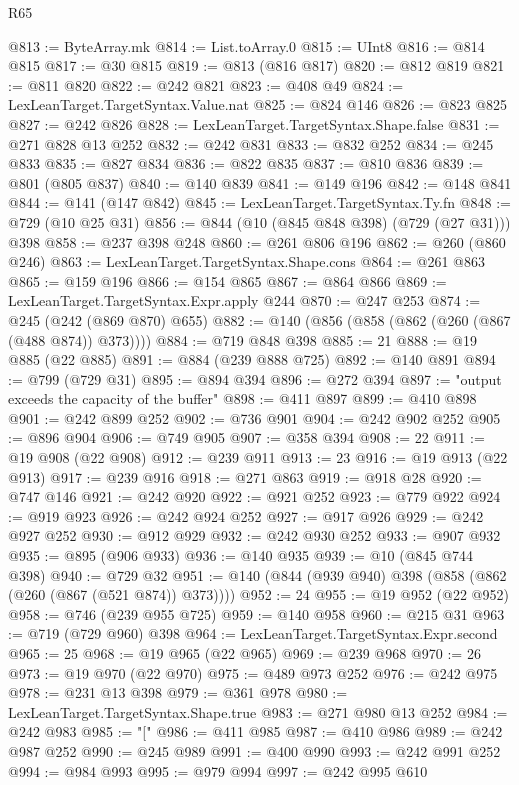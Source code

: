 \begin{lexlean}{R65}
\begin{coremodule}
@813 := ByteArray.mk
@814 := List.toArray.{0}
@815 := UInt8
@816 := @814 @815
@817 := @30 @815
@819 := @813 (@816 @817)
@820 := @812 @819
@821 := @811 @820
@822 := @242 @821
@823 := @408 @49
@824 := LexLeanTarget.TargetSyntax.Value.nat
@825 := @824 @146
@826 := @823 @825
@827 := @242 @826
@828 := LexLeanTarget.TargetSyntax.Shape.false
@831 := @271 @828 @13 @252
@832 := @242 @831
@833 := @832 @252
@834 := @245 @833
@835 := @827 @834
@836 := @822 @835
@837 := @810 @836
@839 := @801 (@805 @837)
@840 := @140 @839
@841 := @149 @196
@842 := @148 @841
@844 := @141 (@147 @842)
@845 := LexLeanTarget.TargetSyntax.Ty.fn
@848 := @729 (@10 @25 @31)
@856 := @844 (@10 (@845 @848 @398) (@729 (@27 @31))) @398
@858 := @237 @398 @248
@860 := @261 @806 @196
@862 := @260 (@860 @246)
@863 := LexLeanTarget.TargetSyntax.Shape.cons
@864 := @261 @863
@865 := @159 @196
@866 := @154 @865
@867 := @864 @866
@869 := LexLeanTarget.TargetSyntax.Expr.apply @244
@870 := @247 @253
@874 := @245 (@242 (@869 @870) @655)
@882 := @140 (@856 (@858 (@862 (@260 (@867 (@488 @874)) @373))))
@884 := @719 @848 @398
@885 := 21
@888 := @19 @885 (@22 @885)
@891 := @884 (@239 @888 @725)
@892 := @140 @891
@894 := @799 (@729 @31)
@895 := @894 @394
@896 := @272 @394
@897 := "output exceeds the capacity of the buffer"
@898 := @411 @897
@899 := @410 @898
@901 := @242 @899 @252
@902 := @736 @901
@904 := @242 @902 @252
@905 := @896 @904
@906 := @749 @905
@907 := @358 @394
@908 := 22
@911 := @19 @908 (@22 @908)
@912 := @239 @911
@913 := 23
@916 := @19 @913 (@22 @913)
@917 := @239 @916
@918 := @271 @863
@919 := @918 @28
@920 := @747 @146
@921 := @242 @920
@922 := @921 @252
@923 := @779 @922
@924 := @919 @923
@926 := @242 @924 @252
@927 := @917 @926
@929 := @242 @927 @252
@930 := @912 @929
@932 := @242 @930 @252
@933 := @907 @932
@935 := @895 (@906 @933)
@936 := @140 @935
@939 := @10 (@845 @744 @398)
@940 := @729 @32
@951 := @140 (@844 (@939 @940) @398 (@858 (@862 (@260 (@867 (@521 @874)) @373))))
@952 := 24
@955 := @19 @952 (@22 @952)
@958 := @746 (@239 @955 @725)
@959 := @140 @958
@960 := @215 @31
@963 := @719 (@729 @960) @398
@964 := LexLeanTarget.TargetSyntax.Expr.second
@965 := 25
@968 := @19 @965 (@22 @965)
@969 := @239 @968
@970 := 26
@973 := @19 @970 (@22 @970)
@975 := @489 @973 @252
@976 := @242 @975
@978 := @231 @13 @398
@979 := @361 @978
@980 := LexLeanTarget.TargetSyntax.Shape.true
@983 := @271 @980 @13 @252
@984 := @242 @983
@985 := "["
@986 := @411 @985
@987 := @410 @986
@989 := @242 @987 @252
@990 := @245 @989
@991 := @400 @990
@993 := @242 @991 @252
@994 := @984 @993
@995 := @979 @994
@997 := @242 @995 @610

\end{coremodule}
\end{lexlean}
